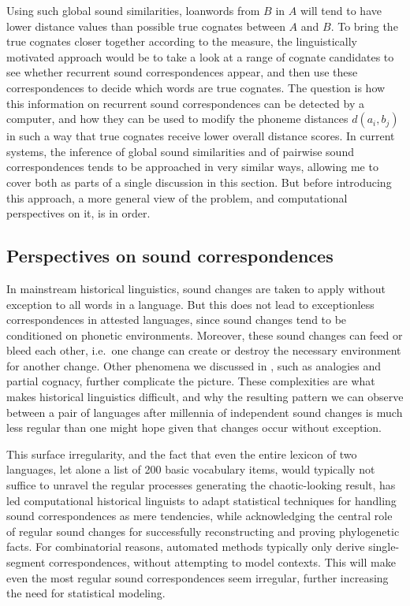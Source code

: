 Using such global sound similarities, loanwords from $B$ in $A$ will tend to have lower distance values than possible true cognates between $A$ and $B$. To bring the true cognates closer together according to the measure, the linguistically motivated approach would be to take a look at a range of cognate candidates to see whether recurrent sound correspondences appear, and then use these correspondences to decide which words are true cognates. The question is how this information on recurrent sound correspondences can be detected by a computer, and how they can be used to modify the phoneme distances $d(a_i,b_j)$ in such a way that true cognates receive lower overall distance scores. In current systems, the inference of global sound similarities and of pairwise sound correspondences tends to be approached in very similar ways, allowing me to cover both as parts of a single discussion in this section. But before introducing this approach, a more general view of the problem, and computational perspectives on
it, is in order.

\subsection{Perspectives on sound correspondences}
In mainstream historical linguistics, sound changes are taken to apply without exception to all words in a language. But this does not lead to exceptionless correspondences in attested languages, since sound changes tend to be conditioned on phonetic environments. Moreover, these sound changes can feed or bleed each other, i.e.\ one change can create or destroy the necessary environment for another change. Other phenomena we discussed in , such as analogies and partial cognacy, further complicate the picture. These complexities are what makes historical linguistics difficult, and why the resulting pattern we can observe between a pair of languages after millennia of independent sound changes is much less regular than one might hope given that changes occur without exception.

This surface irregularity, and the fact that even the entire lexicon of two languages, let alone a list of 200 basic vocabulary items, would typically not suffice to unravel the regular processes generating the chaotic-looking result, has led computational historical linguists to adapt statistical techniques for handling sound correspondences as mere tendencies, while acknowledging the central role of regular sound changes for successfully reconstructing and proving phylogenetic facts. For combinatorial reasons, automated methods typically only derive single-segment correspondences, without attempting to model contexts. This will make even the most regular sound correspondences seem irregular, further increasing the need for statistical modeling.

